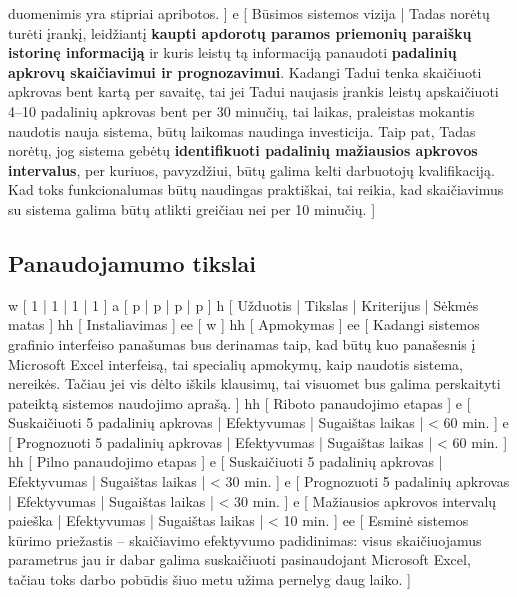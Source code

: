{    duomenimis yra stipriai apribotos.
  ]
  e [ Būsimos sistemos vizija
  | 
    Tadas norėtų turėti įrankį, leidžiantį \textbf{kaupti apdorotų paramos priemonių paraiškų
    istorinę informaciją} ir kuris leistų tą informaciją panaudoti \textbf{padalinių apkrovų 
    skaičiavimui ir prognozavimui}.
    Kadangi Tadui tenka skaičiuoti apkrovas bent kartą per savaitę, tai jei Tadui naujasis 
    įrankis leistų apskaičiuoti 4–10 padalinių apkrovas bent per 30 minučių, 
    tai laikas, praleistas mokantis naudotis nauja sistema, būtų laikomas naudinga investicija.
    Taip pat, Tadas norėtų, jog sistema gebėtų \textbf{identifikuoti padalinių
    mažiausios apkrovos intervalus}, per kuriuos, pavyzdžiui, būtų galima kelti darbuotojų
    kvalifikaciją. Kad toks funkcionalumas būtų naudingas praktiškai, tai 
    reikia, kad skaičiavimus su sistema galima būtų atlikti greičiau
    nei per 10 minučių.
  ]
}

\subsection{Panaudojamumo tikslai}
\xtable
{
  w [ 1 | 1 | 1 | 1 ]
  a [ p | p | p | p ]
  h [ Užduotis | Tikslas | Kriterijus | Sėkmės matas ]
  hh [ Instaliavimas ]
  ee [ w ]
  hh [ Apmokymas ]
  ee 
  [ 
    Kadangi sistemos grafinio interfeiso panašumas bus derinamas taip, kad būtų kuo panašesnis
    į Microsoft Excel interfeisą, tai specialių apmokymų, kaip naudotis sistema, nereikės. Tačiau
    jei vis dėlto iškils klausimų, tai visuomet bus galima perskaityti pateiktą sistemos
    naudojimo aprašą. 
  ]
  hh [ Riboto panaudojimo etapas ]
  e [ Suskaičiuoti 5 padalinių apkrovas | Efektyvumas | Sugaištas laikas | < 60 min. ]
  e [ Prognozuoti 5 padalinių apkrovas | Efektyvumas | Sugaištas laikas | < 60 min. ]
  hh [ Pilno panaudojimo etapas ]
  e [ Suskaičiuoti 5 padalinių apkrovas | Efektyvumas | Sugaištas laikas | < 30 min. ]
  e [ Prognozuoti 5 padalinių apkrovas | Efektyvumas | Sugaištas laikas | < 30 min. ]
  e [ Mažiausios apkrovos intervalų paieška | Efektyvumas | Sugaištas laikas | < 10 min. ]
  ee 
  [ 
    Esminė sistemos kūrimo priežastis – skaičiavimo efektyvumo padidinimas: visus skaičiuojamus
    parametrus jau ir dabar galima suskaičiuoti pasinaudojant Microsoft Excel, tačiau toks
    darbo pobūdis šiuo metu užima pernelyg daug laiko.
  ]
}

